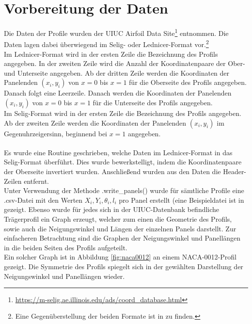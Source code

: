 \section{Vorbereitung der Daten}
Die Daten der Profile wurden der UIUC Airfoil Data Site\footnote{\url{https://m-selig.ae.illinois.edu/ads/coord_database.html}} entnommen. Die Daten lagen dabei überwiegend im Selig- oder Lednicer-Format vor.\footnote{Eine Gegenüberstellung der beiden Formate ist in  zu finden.}
\\
Im Lednicer-Format wird in der ersten Zeile die Bezeichnung des Profils angegeben. In der zweiten Zeile wird die Anzahl der Koordinatenpaare der Ober- und Unterseite angegeben. Ab der dritten Zeile werden die Koordinaten der Panelenden $(x_i,y_i)$ von $x=0$ bis $x=1$ für die Oberseite des Profils angegeben. Danach folgt eine Leerzeile. Danach werden die Koordinaten der Panelenden $(x_i,y_i)$ von $x=0$ bis $x=1$ für die Unterseite des Profils angegeben.
\\
Im Selig-Format wird in der ersten Zeile die Bezeichnung des Profils angegeben. Ab der zweiten Zeile werden die Koordinaten der Panelenden $(x_i,y_i)$ im Gegenuhrzeigersinn, beginnend bei $x=1$ angegeben.
\\\\
Es wurde eine Routine geschrieben, welche Daten im Lednicer-Format in das Selig-Format überführt. Dies wurde bewerkstelligt, indem die Koordinatenpaare der Oberseite invertiert wurden. Anschließend wurden aus den Daten die Header-Zeilen entfernt. \\
Unter Verwendung der Methode .write\_panels() wurde für sämtliche Profile eine .csv-Datei mit den Werten $X_i, Y_i, \theta _i, l_i$ pro Panel erstellt (eine Beispieldatei ist in  gezeigt. Ebenso wurde für jedes sich in der UIUC-Datenbank befindliche Trägerprofil ein Graph erzeugt, welcher zum einen die Geometrie des Profils, sowie auch die Neigungswinkel und Längen der einzelnen Panels darstellt. Zur einfacheren Betrachtung sind die Graphen der Neigungswinkel und Panellängen in die beiden Seiten des Profils aufgeteilt. 
\\Ein solcher Graph ist in Abbildung \ref{fig:naca0012} an einem NACA-0012-Profil gezeigt. Die Symmetrie des Profils spiegelt sich in der gewählten Darstellung der Neigungswinkel und Panellängen wieder.

